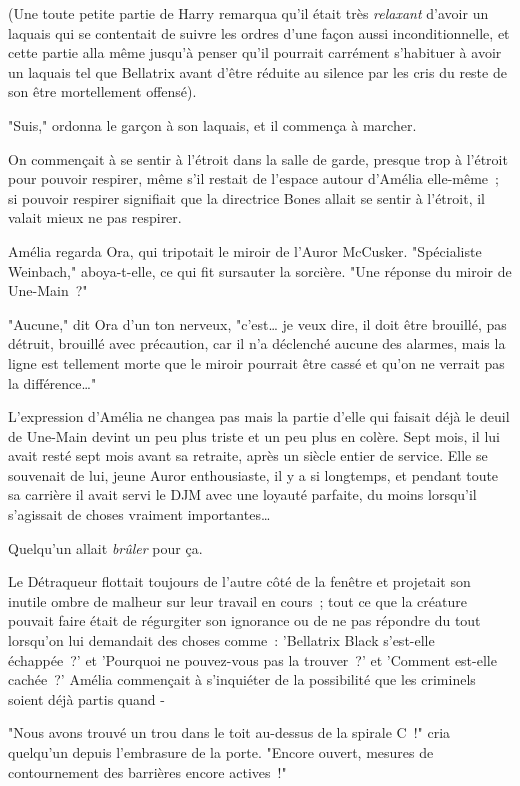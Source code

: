 (Une toute petite partie de Harry remarqua qu'il était très \emph{relaxant} d'avoir un laquais qui se contentait de suivre les ordres d'une façon aussi inconditionnelle, et cette partie alla même jusqu'à penser qu'il pourrait carrément s'habituer à avoir un laquais tel que Bellatrix avant d'être réduite au silence par les cris du reste de son être mortellement offensé).

"Suis," ordonna le garçon à son laquais, et il commença à marcher.

\later

On commençait à se sentir à l'étroit dans la salle de garde, presque trop à l'étroit pour pouvoir respirer, même s'il restait de l'espace autour d'Amélia elle-même~; si pouvoir respirer signifiait que la directrice Bones allait se sentir à l'étroit, il valait mieux ne pas respirer.

Amélia regarda Ora, qui tripotait le miroir de l'Auror McCusker. "Spécialiste Weinbach," aboya-t-elle, ce qui fit sursauter la sorcière. "Une réponse du miroir de Une-Main~?"

"Aucune," dit Ora d'un ton nerveux, "c'est… je veux dire, il doit être brouillé, pas détruit, brouillé avec précaution, car il n'a déclenché aucune des alarmes, mais la ligne est tellement morte que le miroir pourrait être cassé et qu'on ne verrait pas la différence…"

L'expression d'Amélia ne changea pas mais la partie d'elle qui faisait déjà le deuil de Une-Main devint un peu plus triste et un peu plus en colère. Sept mois, il lui avait resté sept mois avant sa retraite, après un siècle entier de service. Elle se souvenait de lui, jeune Auror enthousiaste, il y a si longtemps, et pendant toute sa carrière il avait servi le DJM avec une loyauté parfaite, du moins lorsqu'il s'agissait de choses vraiment importantes…

Quelqu'un allait \emph{brûler} pour ça.

Le Détraqueur flottait toujours de l'autre côté de la fenêtre et projetait son inutile ombre de malheur sur leur travail en cours~; tout ce que la créature pouvait faire était de régurgiter son ignorance ou de ne pas répondre du tout lorsqu'on lui demandait des choses comme~: 'Bellatrix Black s'est-elle échappée~?' et 'Pourquoi ne pouvez-vous pas la trouver~?' et 'Comment est-elle cachée~?' Amélia commençait à s'inquiéter de la possibilité que les criminels soient déjà partis quand -

"Nous avons trouvé un trou dans le toit au-dessus de la spirale C~!" cria quelqu'un depuis l'embrasure de la porte. "Encore ouvert, mesures de contournement des barrières encore actives~!"

